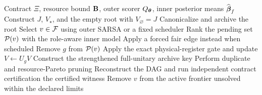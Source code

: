 \begin{algorithm}[t]
\caption{Hierarchical exact synthesis under an ancilla contract}
\label{alg:ancilla-search}
\begin{algorithmic}[1]
\Require Contract $\Xi$, resource bound $\mathbf{B}$, outer scorer $Q_{\boldsymbol{\theta}}$, inner posterior means $\widehat{\boldsymbol{\beta}}_f$
\State Construct $J$, $V_\star$, and the empty root with $V_\varnothing=J$
\State Canonicalize and archive the root
  \State Select $v\in\mathcal{F}$ using outer SARSA or a fixed scheduler
  \State Rank the pending set $\mathcal{P}(v)$ with the role-aware inner model
  \State Apply a forced fair edge instead when scheduled
    \State Remove $g$ from $\mathcal{P}(v)$
    \State Apply the exact physical-register gate and update $V\leftarrow U_gV$
    \State Construct the strengthened full-unitary archive key
    \State Perform duplicate and resource-Pareto pruning
      \State Reconstruct the DAG and run independent contract certification
       \Return the certified witness \EndIf
    \EndIf
  \EndFor
   \State Remove $v$ from the active frontier \EndIf
\EndWhile
\State \Return unsolved within the declared limits
\end{algorithmic}
\end{algorithm}
